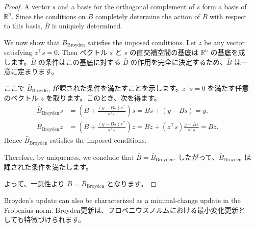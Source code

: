 \documentclass[0_main]{subfiles}
\begin{document}
\begin{proof}
    \ifEn
        A vector $s$ and a basis for the orthogonal complement of $s$ form a basis of $\mathbb{R}^n$. Since the conditions on $\bar{B}$ completely determine the action of $\bar{B}$ with respect to this basis, $\bar{B}$ is uniquely determined.

        We now show that $\bar{B}_{\mathrm{Broyden}}$ satisfies the imposed conditions. Let $z$ be any vector satisfying $z^\top s = 0$. Then
    \else
        ベクトル $s$ と $s$ の直交補空間の基底は $\mathbb{R}^n$ の基底を成します。$\bar{B}$ の条件はこの基底に対する $\bar{B}$ の作用を完全に決定するため、$\bar{B}$ は一意に定まります。

        ここで $\bar{B}_{\mathrm{Broyden}}$ が課された条件を満たすことを示します。$z^\top s = 0$ を満たす任意のベクトル $z$ を取ります。このとき、次を得ます。
    \fi
    \begin{align*}
        \bar{B}_{\mathrm{Broyden}} s
         & = \left(B + \frac{(y - Bs)s^\top}{s^\top s}\right) s
        = Bs + (y - Bs)
        = y,                                                    \\
        \bar{B}_{\mathrm{Broyden}} z
         & = \left(B + \frac{(y - Bs)s^\top}{s^\top s}\right) z
        = Bz + (z^\top s) \frac{y - Bs}{s^\top s}
        = Bz.
    \end{align*}
    \ifEn
        Hence $\bar{B}_{\mathrm{Broyden}}$ satisfies the imposed conditions.

        Therefore, by uniqueness, we conclude that $\bar{B} = \bar{B}_{\mathrm{Broyden}}$.
    \else
        したがって、$\bar{B}_{\mathrm{Broyden}}$ は課された条件を満たします。

        よって、一意性より $\bar{B} = \bar{B}_{\mathrm{Broyden}}$ となります。
    \fi
    \myQED
\end{proof}

\ifEn
    Broyden's update can also be characterized as a minimal-change update in the Frobenius norm.
\else
    Broyden更新は、フロベニウスノルムにおける最小変化更新としても特徴づけられます。
\fi
\end{document}
